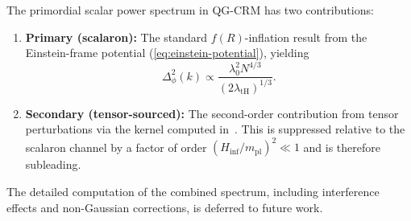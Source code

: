 \documentclass[aps,prd,twocolumn,superscriptaddress,nofootinbib]{revtex4-2}
\begin{document}
The primordial scalar power spectrum in QG-CRM has two contributions:

\begin{enumerate}
\item \textbf{Primary (scalaron):} The standard $f(R)$-inflation result from the Einstein-frame potential (\ref{eq:einstein-potential}), yielding~\cite{LiuQuintinAfshordi2026}
\begin{equation}
\Delta_\phi^2(k) \propto \frac{\lambda_0^2 N^{4/3}}{(2\lambda_\mathrm{tH})^{1/3}}.
\end{equation}

\item \textbf{Secondary (tensor-sourced):} The second-order contribution from tensor perturbations via the kernel computed in~\cite{Bertacca2025}. This is suppressed relative to the scalaron channel by a factor of order $(H_\mathrm{inf}/m_\mathrm{pl})^2 \ll 1$ and is therefore subleading.
\end{enumerate}

The detailed computation of the combined spectrum, including interference effects and non-Gaussian corrections, is deferred to future work.
\end{document}

